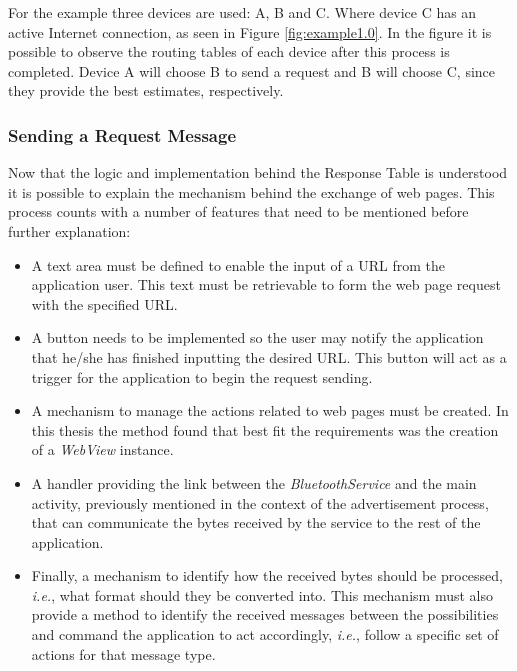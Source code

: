 For the example three devices are used: A, B and C. Where device C has an active Internet connection, as seen in Figure \ref{fig:example1.0}. In the figure it is possible to observe the routing tables of each device after this process is completed. Device A will choose B to send a request and B will choose C, since they provide the best estimates, respectively.


\subsubsection{Sending a Request Message}
\label{subsubsec:sendrqt}

Now that the logic and implementation behind the Response Table is understood it is possible to explain the mechanism behind the exchange of web pages. This process counts with a number of features that need to be mentioned before further explanation:

\begin{itemize}
	\item  A text area must be defined to enable the input of a \gls{URL} from the application user. This text must be retrievable to form the web page request with the specified \gls{URL}.
	
	\item A button needs to be implemented so the user may notify the application that he/she has finished inputting the desired \gls{URL}. This button will act as a trigger for the application to begin the request sending.
	
	\item A mechanism to manage the actions related to web pages must be created. In this thesis the method found that best fit the requirements was the creation of a \textit{WebView} instance.
	
	\item A handler providing the link between the \textit{BluetoothService} and the main activity, previously mentioned in the context of the advertisement process, that can communicate the bytes received by the service to the rest of the application.
	
	\item Finally, a mechanism to identify how the received bytes should be processed, \textit{i.e.}, what format should they be converted into. This mechanism must also provide a method to identify the received messages between the possibilities and command the application to act accordingly, \textit{i.e.}, follow a specific set of actions for that message type.
\end{itemize}

